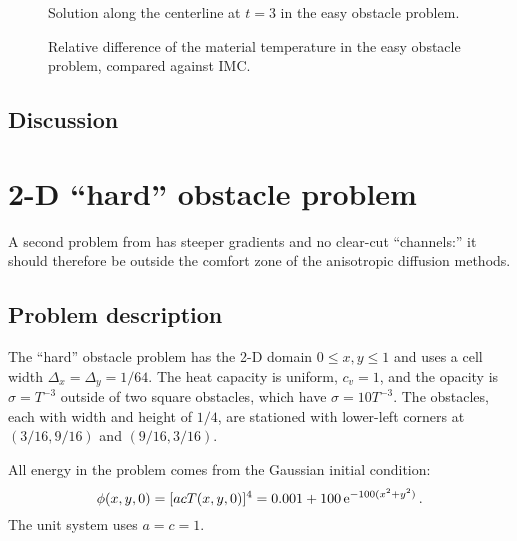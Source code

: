 \begin{figure}[htb]
  \centering
  \caption{Solution along the centerline at $t=3$ in the easy obstacle
  problem.}
  \label{fig:easymkCenterline}
\end{figure}

\begin{figure}[htb]
  \centering
  
  \caption{Relative difference of the material temperature in the easy obstacle
  problem, compared against IMC.}
  \label{fig:easymkConvergence}
\end{figure}

\subsection{Discussion}

\section{2-D \texorpdfstring{``hard''}{hard} obstacle problem}

A second problem from \cite{Mou2006} has steeper gradients and no clear-cut
``channels:'' it should therefore be outside the comfort zone of the anisotropic
diffusion methods.

\subsection{Problem description}

The ``hard'' obstacle problem has the 2-D domain $0 \le x,y \le 1$ and uses a
cell width $\Delta_x=\Delta_y=1/64$. The heat capacity is uniform, $c_v=1$, and
the opacity is $\sigma=T^{-3}$ outside of two square obstacles, which have
$\sigma=10 T^{-3}$. The obstacles, each with width and height of $1/4$, are
stationed with lower-left corners at $(3/16, 9/16)$ and $(9/16,3/16)$.

All energy in the problem comes from the Gaussian initial condition:
\begin{equation*}
  \phi(x,y,0) = [ a c T(x,y,0)]^{4} = 0.001 + 100 \mathop{}\!\mathrm{e}^{-100 (x^2 + y^2) } \,.
\end{equation*}
The unit system uses $a=c=1$.

